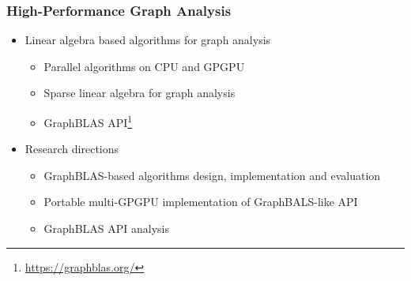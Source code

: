 \documentclass[xcolor=table,aspectratio=169]{beamer}
\begin{document}
\begin{frame}[fragile]
  \frametitle{High-Performance Graph Analysis}
  \begin{itemize}
    \item Linear algebra based algorithms for graph analysis
    \begin{itemize}
      \item Parallel algorithms on CPU and GPGPU
      \item Sparse linear algebra for graph analysis
      \item GraphBLAS API\footnote{\href{https://graphblas.org/}{https://graphblas.org/}}
    \end{itemize} 
    \pause
    \item Research directions
    \begin{itemize}
      \item GraphBLAS-based algorithms design, implementation and evaluation
      \item Portable multi-GPGPU implementation of GraphBALS-like API      
      \item GraphBLAS API analysis
    \end{itemize}
  \end{itemize}
\end{frame}
\end{document}
